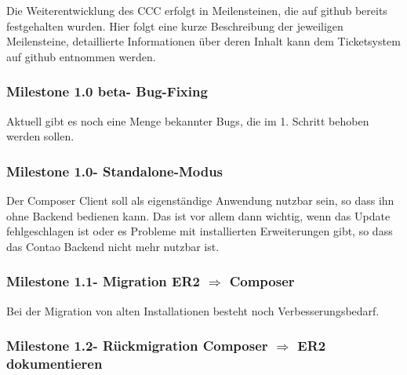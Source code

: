 \documentclass[
paper=a4,
draft=false,%
fontsize=10pt%
]{scrartcl}
\begin{document}
Die Weiterentwicklung des CCC erfolgt in Meilensteinen, die auf github bereits festgehalten wurden. Hier folgt eine kurze Beschreibung der jeweiligen Meilensteine, detaillierte Informationen über deren Inhalt kann dem Ticketsystem auf github entnommen werden.

\subsubsection[Milestone 1.0 beta - Bug-Fixing]{Milestone 1.0 beta\footnotemark - Bug-Fixing}
\label{subsec:ccc-milestone-1.0-beta}

Aktuell gibt es noch eine Menge bekannter Bugs, die im 1. Schritt behoben werden sollen.

\subsubsection[Milestone 1.0 - Standalone-Modus]{Milestone 1.0\footnotemark - Standalone-Modus}
\label{subsec:ccc-milestone-1.0}

Der Composer Client soll als eigenständige Anwendung nutzbar sein, so dass ihn ohne Backend bedienen kann. Das ist vor allem dann wichtig, wenn das Update fehlgeschlagen ist oder es Probleme mit installierten Erweiterungen gibt, so dass das Contao Backend nicht mehr nutzbar ist.

\subsubsection[Milestone 1.1 - Migration ER2 $ \Rightarrow $ Composer]{Milestone 1.1\footnotemark - Migration ER2 $ \Rightarrow $ Composer}
\label{subsec:ccc-milestone-1.1}

Bei der Migration von alten Installationen besteht noch Verbesserungsbedarf.

\subsubsection[Milestone 1.2 - Rückmigration Composer $ \Rightarrow $ ER2 dokumentieren]{Milestone 1.2\footnotemark - Rückmigration Composer $ \Rightarrow $ ER2 dokumentieren}
\label{subsec:ccc-milestone-1.2}
\end{document}
